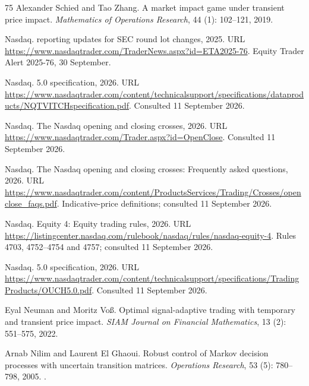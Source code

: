 \documentclass[11pt]{article}
\numberwithin{equation}{section}
\theoremstyle{definition}
\theoremstyle{remark}
\theoremstyle{definition}
\begin{document}
\begin{thebibliography}{75}
Alexander Schied and Tao Zhang.
\newblock A market impact game under transient price impact.
\newblock \emph{Mathematics of Operations Research}, 44 (1):
  102--121, 2019.

{Nasdaq}.
 reporting updates for {SEC} round lot changes, 2025.
\newblock URL \url{https://www.nasdaqtrader.com/TraderNews.aspx?id=ETA2025-76}.
\newblock Equity Trader Alert 2025-76, 30 September.

{Nasdaq}.
 5.0 specification, 2026{}.
\newblock URL
  \url{https://www.nasdaqtrader.com/content/technicalsupport/specifications/dataproducts/NQTVITCHspecification.pdf}.
\newblock Consulted 11 September 2026.

{Nasdaq}.
\newblock The {Nasdaq} opening and closing crosses, 2026{}.
\newblock URL \url{https://www.nasdaqtrader.com/Trader.aspx?id=OpenClose}.
\newblock Consulted 11 September 2026.

{Nasdaq}.
\newblock The {Nasdaq} opening and closing crosses: Frequently asked questions,
  2026{}.
\newblock URL
  \url{https://www.nasdaqtrader.com/content/ProductsServices/Trading/Crosses/openclose_faqs.pdf}.
\newblock Indicative-price definitions; consulted 11 September 2026.

{Nasdaq}.
\newblock Equity 4: Equity trading rules, 2026{}.
\newblock URL
  \url{https://listingcenter.nasdaq.com/rulebook/nasdaq/rules/nasdaq-equity-4}.
\newblock Rules 4703, 4752--4754 and 4757; consulted 11 September 2026.

{Nasdaq}.
 5.0 specification, 2026{}.
\newblock URL
  \url{https://www.nasdaqtrader.com/content/technicalsupport/specifications/TradingProducts/OUCH5.0.pdf}.
\newblock Consulted 11 September 2026.

Eyal Neuman and Moritz Vo{\ss}.
\newblock Optimal signal-adaptive trading with temporary and transient price
  impact.
\newblock \emph{SIAM Journal on Financial Mathematics}, 13
  (2): 551--575, 2022.

Arnab Nilim and Laurent {El Ghaoui}.
\newblock Robust control of {Markov} decision processes with uncertain
  transition matrices.
\newblock \emph{Operations Research}, 53 (5):
  780--798, 2005.
\newblock {}.


\end{thebibliography}
\end{document}
